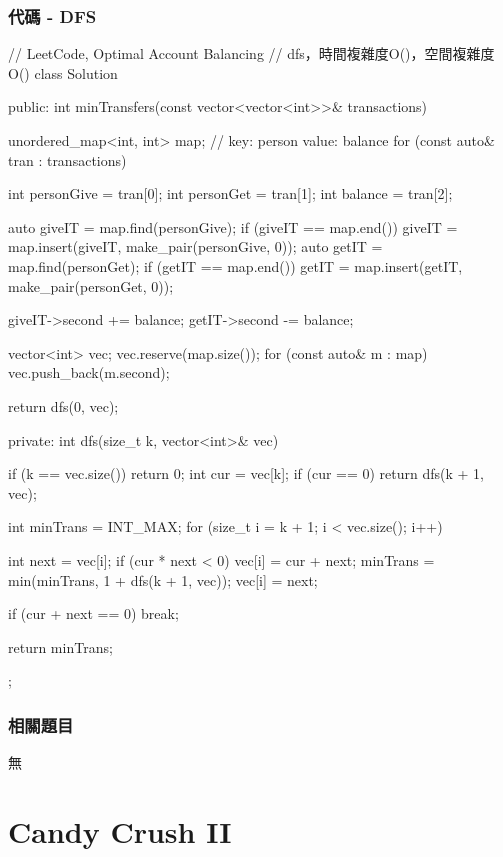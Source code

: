 \subsubsection{代碼 - DFS}
\begin{Code}
// LeetCode, Optimal Account Balancing
// dfs，時間複雜度O()，空間複雜度O()
class Solution {
public:
    int minTransfers(const vector<vector<int>>& transactions)
    {
        unordered_map<int, int> map; // key: person value: balance
        for (const auto& tran : transactions)
        {
            int personGive = tran[0];
            int personGet = tran[1];
            int balance = tran[2];

            auto giveIT = map.find(personGive);
            if (giveIT == map.end()) giveIT = map.insert(giveIT, make_pair(personGive, 0));
            auto getIT = map.find(personGet);
            if (getIT == map.end()) getIT = map.insert(getIT, make_pair(personGet, 0));

            giveIT->second += balance;
            getIT->second -= balance;
        }

        vector<int> vec; vec.reserve(map.size());
        for (const auto& m : map)
        {
            vec.push_back(m.second);
        }

        return dfs(0, vec);
    }
private:
    int dfs(size_t k, vector<int>& vec)
    {
        if (k == vec.size()) return 0;
        int cur = vec[k];
        if (cur == 0)
            return dfs(k + 1, vec);

        int minTrans = INT_MAX;
        for (size_t i = k + 1; i < vec.size(); i++)
        {
            int next = vec[i];
            if (cur * next < 0)
            {
                vec[i] = cur + next;
                minTrans = min(minTrans, 1 + dfs(k + 1, vec));
                vec[i] = next;
            }

            if (cur + next == 0) break;
        }

        return minTrans;
    }
};
\end{Code}

\subsubsection{相關題目}
\begindot
\item 無
\myenddot

\section{Candy Crush II} %
\label{sec:candy-crush-ii}


